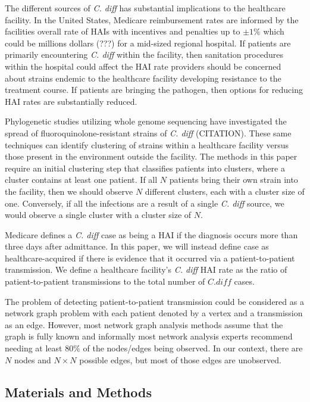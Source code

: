 \documentclass[]{article}
\begin{document}
The different sources of \emph{C. diff} has substantial implications to
the healthcare facility. In the United States, Medicare reimbursement
rates are informed by the facilities overall rate of HAIs with
incentives and penalties up to \(\pm 1 \%\) which could be millions
dollars (???) for a mid-sized regional hospital. If patients are
primarily encountering \emph{C. diff} within the facility, then
sanitation procedures within the hospital could affect the HAI rate
providers should be concerned about strains endemic to the healthcare
facility developing resistance to the treatment course. If patients are
bringing the pathogen, then options for reducing HAI rates are
substantially reduced.

Phylogenetic studies utilizing whole genome sequencing have investigated
the spread of fluoroquinolone-resistant strains of \emph{C. diff}
(CITATION). These same techniques can identify clustering of strains
within a healthcare facility versus those present in the environment
outside the facility. The methods in this paper require an initial
clustering step that classifies patients into clusters, where a cluster
contains at least one patient. If all \(N\) patients bring their own
strain into the facility, then we should observe \(N\) different
clusters, each with a cluster size of one. Conversely, if all the
infections are a result of a single \emph{C. diff} source, we would
observe a single cluster with a cluster size of \(N\).

Medicare defines a \emph{C. diff} case as being a HAI if the diagnosis
occurs more than three days after admittance. In this paper, we will
instead define case as healthcare-acquired if there is evidence that it
occurred via a patient-to-patient transmission. We define a healthcare
facility's \emph{C. diff} HAI rate as the ratio of patient-to-patient
transmissions to the total number of \(C. diff\) cases.

The problem of detecting patient-to-patient transmission could be
considered as a network graph problem with each patient denoted by a
vertex and a transmission as an edge. However, most network graph
analysis methods assume that the graph is fully known and informally
most network analysis experts recommend needing at least \(80\%\) of the
nodes/edges being observed. In our context, there are \(N\) nodes and
\(N \times N\) possible edges, but most of those edges are unobserved.

\hypertarget{materials-and-methods}{%
\subsection{Materials and Methods}\label{materials-and-methods}}
\end{document}
